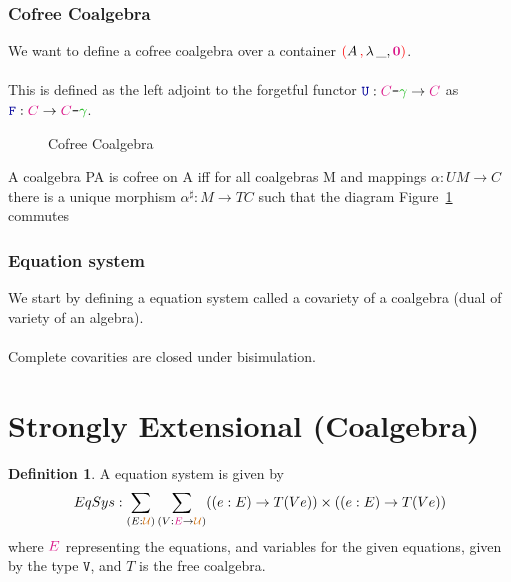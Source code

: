 \documentclass[twoside,11pt,openright]{report}
\theoremstyle{plain} %
\theoremstyle{definition}
\newtheorem{defn}{Definition}[section]
\theoremstyle{remark}
\newcommand*{\figref}[1]{Figure~\ref{fig:#1}}
\newcommand*{\term}[1]{\textcolor{green!70!black}{#1}} %
\newcommand*{\type}[1]{\textcolor{magenta!90!black}{#1}}
\newcommand*{\containerpair}[2]{\textcolor{red}{(}#1\,\textcolor{red}{,}\,#2\textcolor{red}{)}}
\newcommand*{\universe}[1]{\textcolor{orange!80!black}{#1}}
\newcommand*{\empt}{\type{\textbf{0}}}
\newcommand*{\coalg}[2]{#1\texttt{-}#2}
\newcommand*{\function}[1]{\textcolor{blue!60!black}{\ensuremath{\mathtt{#1}}}}
\newcommand*{\typeformer}[1]{\ensuremath{\mathtt{#1}}}
\newcommand*{\functor}[1]{\ensuremath{\mathbf{\mathtt{#1}}}}
\begin{document}
\subsubsection{Cofree Coalgebra}
We want to define a cofree coalgebra over a container \(\containerpair{A}{\lambda\,\_, \empt}\).
\\ \\
This is defined as the left adjoint to the forgetful functor \(\function{U} : \coalg{\type{C}}{\term{\gamma}} \rightarrow \type{C}\) as \(\function{F} : \type{C} \rightarrow \coalg{\type{C}}{\term{\gamma}}\).

\begin{figure}[h]
  \centering
  \caption{Cofree Coalgebra}
  \label{fig:cofree-coalgebra}
\end{figure}

A coalgebra PA is cofree on A iff for all coalgebras M and mappings \(\alpha : UM \rightarrow C\) there is a unique morphism \(\alpha^\sharp : M \rightarrow TC\) such that the diagram \figref{cofree-coalgebra} commutes

\subsubsection{Equation system}
We start by defining a equation system called a covariety \cite{Hughes} of a coalgebra (dual of variety of an algebra).
\\ \\
Complete covarities are closed under bisimulation.

\section{Strongly Extensional (Coalgebra)}


\begin{defn}
  A equation system is given by
  \begin{equation}
    EqSys : \sum_{(E : \universe{\mathcal{U}})} \sum_{(V : \type{E} \rightarrow \universe{\mathcal{U}})} ((e : E) \rightarrow T (V e)) \times ((e : E) \rightarrow T (V e))
  \end{equation}
  where \(\type{E}\) representing the equations, and variables for the given equations, given by the type \(\typeformer{V}\), and \(T\) is the free coalgebra.
\end{defn}
\end{document}
